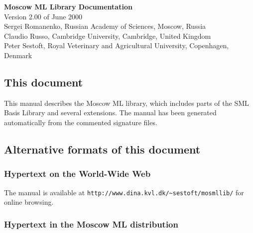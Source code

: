 \documentclass[fleqn,twoside,a4paper]{article}
\begin{document}
\begin{center}

  \vspace*{0cm}

{\huge\bf Moscow ML Library Documentation}\\[0.5cm]

{Version 2.00 of June 2000}\\[0.5cm]

Sergei Romanenko, Russian Academy of Sciences, Moscow, Russia\\
Claudio Russo, Cambridge University, Cambridge, United Kingdom\\
Peter Sestoft, Royal Veterinary and Agricultural University, 
Copenhagen, Denmark

\end{center}

\vspace{1cm}

\subsection*{This document}

This manual describes the Moscow ML library, which includes parts of
the SML Basis Library and several extensions.  The manual has been
generated automatically from the commented signature files.


\subsection*{Alternative formats of this document}

\subsubsection*{Hypertext on the World-Wide Web}
  
The manual is available at
\verb$http://www.dina.kvl.dk/~sestoft/mosmllib/$ for online browsing.


\subsubsection*{Hypertext in the Moscow ML distribution}
  
\end{document}
